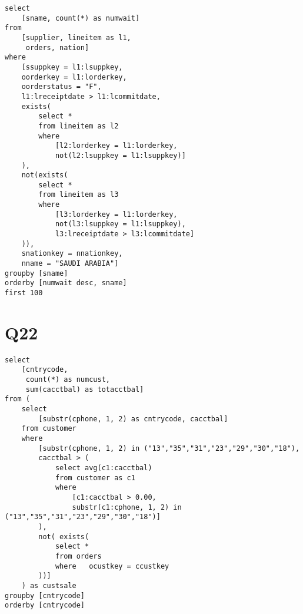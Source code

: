 \begin{lstlisting}
select
	[sname, count(*) as numwait]
from
	[supplier, lineitem as l1,
	 orders, nation]
where
	[ssuppkey = l1:lsuppkey,
	oorderkey = l1:lorderkey,
	oorderstatus = "F",
	l1:lreceiptdate > l1:lcommitdate,
	exists(
		select *
		from lineitem as l2
		where
			[l2:lorderkey = l1:lorderkey,
			not(l2:lsuppkey = l1:lsuppkey)]
	),
	not(exists(
		select *
		from lineitem as l3
		where
			[l3:lorderkey = l1:lorderkey,
			not(l3:lsuppkey = l1:lsuppkey),
			l3:lreceiptdate > l3:lcommitdate]
	)),
	snationkey = nnationkey,
	nname = "SAUDI ARABIA"]
groupby	[sname]
orderby	[numwait desc, sname] 
first 100
\end{lstlisting}

\clearpage

\section*{Q22}
\label{sec:Q22}

\begin{lstlisting}
select
	[cntrycode,
	 count(*) as numcust,
	 sum(cacctbal) as totacctbal]
from (
	select
		[substr(cphone, 1, 2) as cntrycode, cacctbal]
	from customer 
	where
		[substr(cphone, 1, 2) in ("13","35","31","23","29","30","18"),
		cacctbal > (
			select avg(c1:cacctbal)
			from customer as c1
			where
				[c1:cacctbal > 0.00,
				substr(c1:cphone, 1, 2) in ("13","35","31","23","29","30","18")]
		),
		not( exists(
			select *
			from orders
			where	ocustkey = ccustkey
		))]
	) as custsale
groupby	[cntrycode]
orderby	[cntrycode]
\end{lstlisting}

%
%
%